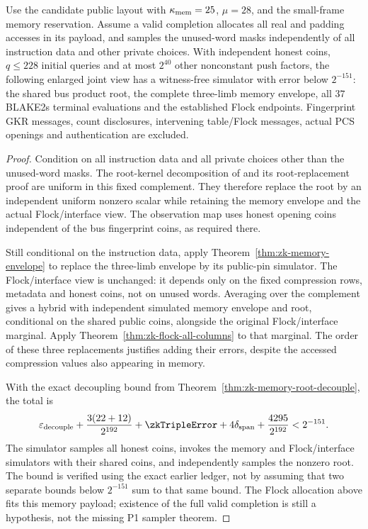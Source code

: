 \begin{corollary}\label{cor:zk-flock-memory-interface}
Use the candidate public layout with $\kappa_{\mathrm{mem}}=25$, $\mu=28$, and the small-frame memory reservation. Assume a valid completion allocates all real and padding accesses in its payload, and samples the unused-word masks independently of all instruction data and other private choices. With independent honest coins, $q\le228$ initial queries and at most $2^{40}$ other nonconstant push factors, the following enlarged joint view has a witness-free simulator with error below $2^{-151}$: the shared bus product root, the complete three-limb memory envelope, all $37$ BLAKE2s terminal evaluations and the established Flock endpoints. Fingerprint GKR messages, count disclosures, intervening table/Flock messages, actual PCS openings and authentication are excluded.
\end{corollary}
\begin{proof}
Condition on all instruction data and all private choices other than the unused-word masks. The root-kernel decomposition of  and its root-replacement proof are uniform in this fixed complement. They therefore replace the root by an independent uniform nonzero scalar while retaining the memory envelope and the actual Flock/interface view. The observation map uses honest opening coins independent of the bus fingerprint coins, as required there.

Still conditional on the instruction data, apply Theorem~\ref{thm:zk-memory-envelope} to replace the three-limb envelope by its public-pin simulator. The Flock/interface view is unchanged: it depends only on the fixed compression rows, metadata and honest coins, not on unused words. Averaging over the complement gives a hybrid with independent simulated memory envelope and root, conditional on the shared public coins, alongside the original Flock/interface marginal. Apply Theorem~\ref{thm:zk-flock-all-columns} to that marginal. The order of these three replacements justifies adding their errors, despite the accessed compression values also appearing in memory.

With the exact decoupling bound from Theorem~\ref{thm:zk-memory-root-decouple}, the total is
\[
 \varepsilon_{\mathrm{decouple}}+\frac{3(22+12)}{2^{192}}
 +\zkTripleError+4\delta_{\mathrm{span}}+\frac{4295}{2^{192}}
 <2^{-151}.
\]
The simulator samples all honest coins, invokes the memory and Flock/interface simulators with their shared coins, and independently samples the nonzero root. The bound is verified using the exact earlier ledger, not by assuming that two separate bounds below $2^{-151}$ sum to that same bound. The Flock allocation above fits this memory payload; existence of the full valid completion is still a hypothesis, not the missing P1 sampler theorem.
\end{proof}


